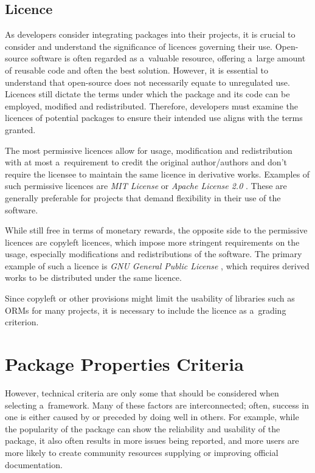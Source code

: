 \subsection{Licence}
As developers consider integrating packages into their projects, it is crucial
to consider and understand the significance of licences governing their use.
Open-source software is often regarded as a~valuable resource, offering a~large
amount of reusable code and often the best solution. However, it is essential to
understand that open-source does not necessarily equate to unregulated use.
Licences still dictate the terms under which the package and its code can be
employed, modified and redistributed. Therefore, developers must examine the
licences of potential packages to ensure their intended use aligns with the
terms granted.

The most permissive licences allow for usage, modification and redistribution
with at most a~requirement to credit the original author/authors and don't
require the licensee to maintain the same licence in derivative works. Examples
of such permissive licences are \textit{MIT License} \cite{MITLicense} or
\textit{Apache License 2.0} \cite{ApacheLicense2}. These are generally preferable
for projects that demand flexibility in their use of the software.

While still free in terms of monetary rewards, the opposite side to the
permissive licences are copyleft licences, which impose more stringent
requirements on the usage, especially modifications and redistributions of the
software. The primary example of such a licence is \textit{GNU General Public
License} \cite{GNUGPL}, which requires derived works to be distributed under the
same licence.

Since copyleft or other provisions might limit the usability of libraries such
as ORMs for many projects, it is necessary to include the licence as a~grading
criterion.

\section{Package Properties Criteria}

However, technical criteria are only some that should be considered when
selecting a~framework. Many of these factors are interconnected; often, success
in one is either caused by or preceded by doing well in others. For example,
while the popularity of the package can show the reliability and usability of
the package, it also often results in more issues being reported, and more
users are more likely to create community resources supplying or improving
official documentation.

